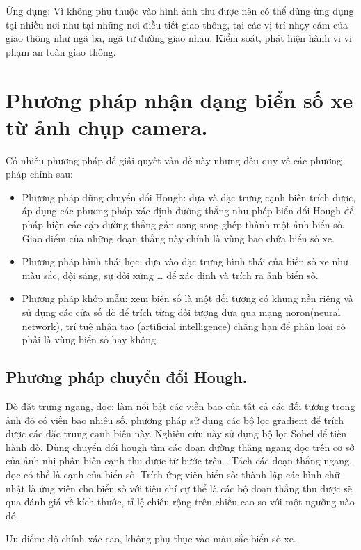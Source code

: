 	    Ứng dụng: Vì không phụ thuộc vào hình ảnh thu được nên có thể dùng ứng dụng tại nhiều nơi như tại những nơi điều tiết giao thông, tại các vị trí nhạy cảm của giao thông như ngã ba, ngã tư đường giao nhau. Kiểm soát, phát hiện hành vi vi phạm an toàn giao thông.
	    
    \section {Phương pháp nhận dạng biển số xe từ ảnh chụp camera.}
    Có nhiều phương pháp để giải quyết vấn đề này nhưng đều quy về các phương pháp chính sau:
    \begin{itemize}
        \item Phương pháp dũng chuyển đổi Hough: dựa và đặc trưng cạnh biên trích được, áp dụng các phương pháp xác định đường thẳng như phép biển dổi Hough để pháp hiện các cặp đường thẳng gần song song ghép thành một ảnh  biển số. Giao điểm của những đoạn thẳng này chính là vùng bao chứa biển số xe.
        \item Phương pháp hình thái học: dựa vào đặc trưng hình thái của biển số xe như màu sắc, đội sáng, sự đối xứng … để xác định và trích ra ảnh biển số.
        \item Phương pháp khớp mẫu: xem biển số là một đối tượng có khung nền riêng và sử dụng các cửa số dò để trích từng đối tượng đưa qua mạng noron(neural network), trí tuệ nhận tạo (artificial intelligence) chẳng hạn để phân loại có phải là vùng biển số hay không.
    \end{itemize}
        \subsection{Phương pháp chuyển đổi Hough.}
        Dò đặt trưng ngang, dọc: làm nổi bật các viền bao của tất cả các đối tượng trong ảnh đó có viền bao nhiêu số. phương pháp sử dụng các bộ lọc gradient để trích được các đặc trung cạnh biên này. Nghiên cứu này sử dụng bộ lọc Sobel để tiến hành dò. Dùng chuyển dổi hough tìm các đoạn đường thẳng ngang dọc trên cơ sở của ảnh nhị phân biên cạnh thu được từ bước trên
        .
        Tách các đoạn thẳng ngang, dọc có thể là cạnh của biển số.
	    Trích ứng viên biển số: thành lập các hình chữ nhật là ứng viên cho biển số với tiêu chí cự thể là các bộ đoạn thẳng thu được sẽ qua đánh giá về kích thước, tỉ lệ chiều rộng trên chiều cao so với một ngưỡng nào đó.
	    
	    Ưu điểm: độ chính xác cao, không phụ thục vào màu sắc biển số xe.
	    
